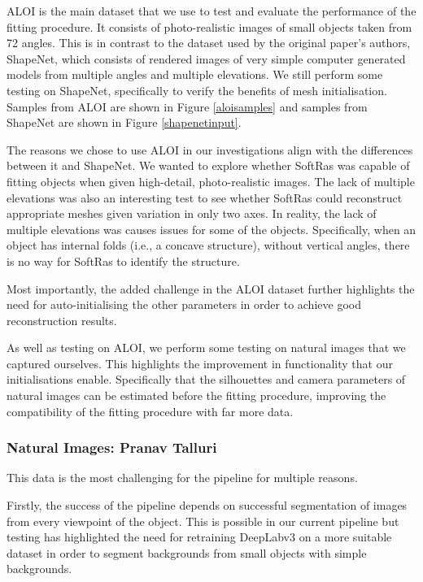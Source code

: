 \documentclass{article}
\begin{document}
ALOI is the main dataset that we use to test and evaluate the performance of the fitting procedure. It consists of photo-realistic images of small objects taken from 72 angles. This is in contrast to the dataset used by the original paper's authors, ShapeNet, which consists of rendered images of very simple computer generated models from multiple angles and multiple elevations. We still perform some testing on ShapeNet, specifically to verify the benefits of mesh initialisation. Samples from ALOI are shown in Figure \ref{aloisamples} and samples from ShapeNet are shown in Figure \ref{shapenetinput}.

The reasons we chose to use ALOI in our investigations align with the differences between it and ShapeNet. We wanted to explore whether SoftRas was capable of fitting objects when given high-detail, photo-realistic images. The lack of multiple elevations was also an interesting test to see whether SoftRas could reconstruct appropriate meshes given variation in only two axes. In reality, the lack of multiple elevations was causes issues for some of the objects. Specifically, when an object has internal folds (i.e., a concave structure), without vertical angles, there is no way for SoftRas to identify the structure.

Most importantly, the added challenge in the ALOI dataset further highlights the need for auto-initialising the other parameters in order to achieve good reconstruction results.

As well as testing on ALOI, we perform some testing on natural images that we captured ourselves. This highlights the improvement in functionality that our initialisations enable. Specifically that the silhouettes and camera parameters of natural images can be estimated before the fitting procedure, improving the compatibility of the fitting procedure with far more data.

\subsubsection{Natural Images: Pranav Talluri}

This data is the most challenging for the pipeline for multiple reasons. 

Firstly, the success of the pipeline depends on successful segmentation of images from every viewpoint of the object. This is possible in our current pipeline but testing has highlighted the need for retraining DeepLabv3 on a more suitable dataset in order to segment backgrounds from small objects with simple backgrounds.
\end{document}

